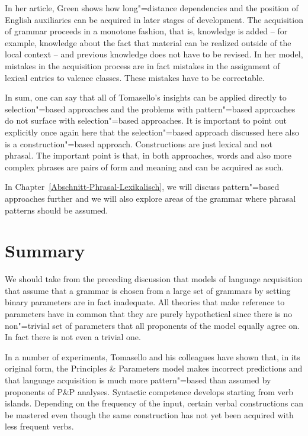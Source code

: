 In her article, Green shows how long"=distance dependencies and the position of English auxiliaries can be acquired in later stages of development.
The acquisition of grammar proceeds in a monotone fashion, that is, knowledge is added -- for example, knowledge about the fact that
material can be realized outside of the local context -- and previous knowledge does not have to be revised.
In her model, mistakes in the acquisition process are in fact mistakes in the assignment of lexical
entries to valence classes. These mistakes have to be correctable. 

In sum, one can say that all of Tomasello's insights can be applied directly to selection"=based approaches and the problems with pattern"=based
approaches do not surface with selection"=based approaches. It is important to point out explicitly once again here that the selection"=based approach
discussed here also is a construction"=based approach. Constructions are just lexical and not phrasal.
The important point is that, in both approaches, words and also more complex phrases are pairs of form and meaning and can be acquired as such.

In Chapter~\ref{Abschnitt-Phrasal-Lexikalisch}, we will discuss pattern"=based approaches further
and we will also explore areas of the grammar where phrasal patterns should be assumed.


\section{Summary}

We should take from the preceding discussion that models of language acquisition that assume that a grammar is chosen
from a large set of grammars by setting binary parameters are in fact inadequate.
All theories that make reference to parameters have in common that they are purely hypothetical since there is no
non"=trivial set of parameters that all proponents of the model equally agree on. In fact there is
not even a trivial one.

In a number of experiments, Tomasello and his colleagues have shown that, in its original form, the Principles \& Parameters model makes incorrect
predictions and that language acquisition is much more pattern"=based than assumed by proponents of P\&P analyses.
Syntactic competence develops starting from verb islands. Depending on the frequency of the input, certain verbal constructions can be
mastered even though the same construction has not yet been acquired with less frequent verbs.

